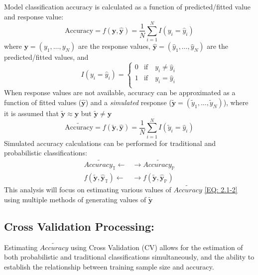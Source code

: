 \documentclass[12pt,]{article}
\begin{document}
Model classification accuracy is calculated as a function of
predicted/fitted value and response value:
\[\text{Accuracy} = f(\mathbf{y}, \mathbf{\hat{y}}) = \frac{1}{N} \sum_{i=1}^{N}  I\left(y_{i}=\hat{y}_{i} \right)\]
where \(\mathbf{y}=\left(y_{1}, \ldots, y_{N}\right)\) are the response
values,
\(\mathbf{\hat{y}}=\left(\hat{y}_{1},\ldots, \hat{y}_{N} \right)\) are
the predicted/fitted values, and\\
\[
I\left(y_{i}=\hat{y}_{i} \right)=
\begin{cases} 
0 &\mbox{if} \quad  y_{i} \neq \hat{y}_{i} \\ 
1 &\mbox{if} \quad  y_{i} = \hat{y}_{i} \\ 
\end{cases}
\] When response values are not available, accuracy can be approximated
as a function of fitted values (\(\mathbf{\hat{y}}\)) and a
\textit{simulated} response
(\(\tilde{\mathbf{y}}=\left(\tilde{y}_{1}, \ldots, \tilde{y}_{N} \right)\)),
where it is assumed that \(\mathbf{\tilde{y}}\approx\mathbf{y}\) but
\(\mathbf{\tilde{y}} \neq \mathbf{y}\) \[
\tilde{\text{Accuracy}} = f(\mathbf{\tilde{y}}, \mathbf{\hat{y}}) = \frac{1}{N} \sum_{i=1}^{N}  I\left(\tilde{y}_{i}=\hat{y}_{i} \right) \tag{EQ: 2.1-1} \label{EQ: 2.1-1}
\] Simulated accuracy calculations can be performed for traditional and
probabilistic classifications: \begin{align*}
\tilde{Accuracy_{\mathbb{T}}} \leftarrow & \rightarrow \tilde{Accuracy_{\mathbb{P}}} \\[0.5em]
f\left(\mathbf{\tilde{y}}, \mathbf{\hat{y}}_{\mathbb{T}} \right) \leftarrow & \rightarrow f\left(\mathbf{\tilde{y}}, \mathbf{\hat{y}}_{\mathbb{P}} \right) \tag{EQ: 2.1-2} \label{EQ: 2.1-2}
\end{align*} This analysis will focus on estimating various values of
\(\tilde{Accuracy}\) \eqref{EQ: 2.1-2} using multiple methods of
generating values of \(\tilde{\mathbf{y}}\)

\hypertarget{cross-validation-processing}{%
\subsection{Cross Validation
Processing:}\label{cross-validation-processing}}

Estimating \(\tilde{Accuracy}\) using Cross Validation (CV) allows for
the estimation of both probabilistic and traditional classifications
simultaneously, and the ability to establish the relationship between
training sample size and accuracy.
\end{document}
